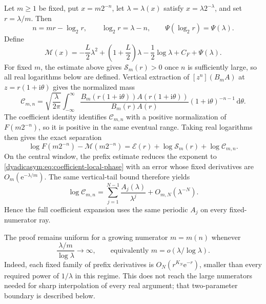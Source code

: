 \documentclass[11pt,oneside]{article}
\theoremstyle{definition}
\theoremstyle{remark}
\newcommand{\e}{\mathrm e}
\newcommand{\ii}{\mathrm i}
\newcommand{\dd}{\,\mathrm d}
\begin{document}
Let $m\ge1$ be fixed, put $x=m2^{-n}$, let $\lambda=\lambda(x)$ satisfy
$x=\lambda2^{-\lambda}$, and set $r=\lambda/m$.  Then
\begin{equation}
 n=mr-\log_2r,\qquad \log_2r=\lambda-n,
 \qquad \Psi(\log_2r)=\Psi(\lambda).
 \label{dyadicasym:eq:fixed-ray-phase-lock}
\end{equation}
Define
\begin{equation}
 \mathcal M(x)=-\frac L2\lambda^2+
 \left(1+\frac L2\right)\lambda-\frac12\log\lambda
 +C_F+\Psi(\lambda).
 \label{dyadicasym:eq:general-main}
\end{equation}
For fixed \(m\), the estimate above gives \(\mathcal S_m(r)>0\) once \(n\) is
sufficiently large, so all real logarithms below are defined.  Vertical extraction of
\([z^n](B_mA)\) at \(z=r(1+\ii\theta)\) gives the normalized mass
\begin{equation}
 \mathcal C_{m,n}
 =\sqrt{\frac{\lambda}{2\pi}}
 \int_{-\infty}^{\infty}
 \frac{B_m(r(1+\ii\theta))A(r(1+\ii\theta))}
      {B_m(r)A(r)}
 (1+\ii\theta)^{-n-1}\dd\theta.
 \label{dyadicasym:eq:Cmn-def}
\end{equation}
The coefficient identity identifies \(\mathcal C_{m,n}\) with a positive normalization of
\(F(m2^{-n})\), so it is positive in the same eventual range.  Taking real logarithms then
gives the exact separation
\begin{equation}
 \boxed{
 \log F(m2^{-n})-\mathcal M(m2^{-n})
 =\mathcal E(r)+\log\mathcal S_m(r)+\log\mathcal C_{m,n}.}
 \label{dyadicasym:eq:fixed-ray-separation}
\end{equation}
On the central window, the prefix estimate reduces the exponent to
\eqref{dyadicasym:eq:coefficient-local-phase} with an error whose fixed derivatives are
$O_m(\e^{-\lambda/m})$.  The same vertical-tail bound therefore yields
\begin{equation}
 \log\mathcal C_{m,n}
 =\sum_{j=1}^{N-1}\frac{A_j(\lambda)}{\lambda^j}
 +O_{m,N}(\lambda^{-N}).
 \label{dyadicasym:eq:fixed-ray-all-orders}
\end{equation}
Hence the full coefficient expansion uses the same periodic $A_j$ on every fixed-numerator
ray.

The proof remains uniform for a growing numerator $m=m(n)$ whenever
\begin{equation}
 \frac{\lambda/m}{\log\lambda}\longrightarrow\infty,
 \qquad\text{equivalently }m=o(\lambda/\log\lambda).
 \label{dyadicasym:eq:moderate-numerator-condition}
\end{equation}
Indeed, each fixed family of prefix derivatives is
$O_N(r^{K_N}\e^{-r})$, smaller than every required power of $1/\lambda$ in this
regime.  This does not reach the large numerators needed for sharp interpolation of every
real argument; that two-parameter boundary is described below.
\end{document}
